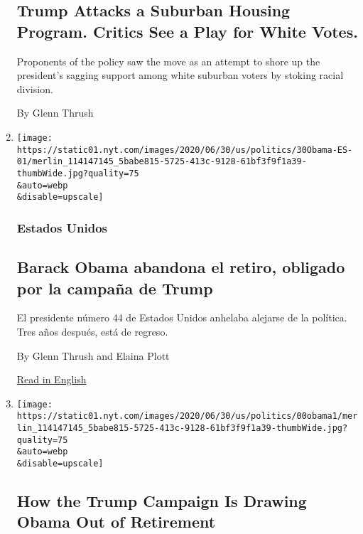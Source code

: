 \begin{enumerate}
  \hypertarget{trump-attacks-a-suburban-housing-program-critics-see-a-play-for-white-votes}{%
  \subsection{Trump Attacks a Suburban Housing Program. Critics See a
  Play for White
  Votes.}\label{trump-attacks-a-suburban-housing-program-critics-see-a-play-for-white-votes}}

  Proponents of the policy saw the move as an attempt to shore up the
  president's sagging support among white suburban voters by stoking
  racial division.

  By Glenn Thrush
\item
  \href{/es/2020/06/30/espanol/obama-biden-trump.html}{}

  \texttt{[image: https://static01.nyt.com/images/2020/06/30/us/politics/30Obama-ES-01/merlin\_114147145\_5babe815-5725-413c-9128-61bf3f9f1a39-thumbWide.jpg?quality=75\\\&auto=webp\\\&disable=upscale]}

  \hypertarget{estados-unidos}{%
  \subsubsection{Estados Unidos}\label{estados-unidos}}

  \hypertarget{barack-obama-abandona-el-retiro-obligado-por-la-campauxf1a-de-trump}{%
  \subsection{Barack Obama abandona el retiro, obligado por la campaña
  de
  Trump}\label{barack-obama-abandona-el-retiro-obligado-por-la-campauxf1a-de-trump}}

  El presidente número 44 de Estados Unidos anhelaba alejarse de la
  política. Tres años después, está de regreso.

  By Glenn Thrush and Elaina Plott

  \href{https://www.nytimes.com/2020/06/28/us/politics/obama-biden-trump.html}{Read
  in English}
\item
  \href{/2020/06/28/us/politics/obama-biden-trump.html}{}

  \texttt{[image: https://static01.nyt.com/images/2020/06/30/us/politics/00obama1/merlin\_114147145\_5babe815-5725-413c-9128-61bf3f9f1a39-thumbWide.jpg?quality=75\\\&auto=webp\\\&disable=upscale]}

  \hypertarget{how-the-trump-campaign-is-drawing-obama-out-of-retirement}{%
  \subsection{How the Trump Campaign Is Drawing Obama Out of
  Retirement}\label{how-the-trump-campaign-is-drawing-obama-out-of-retirement}}


\end{enumerate}
